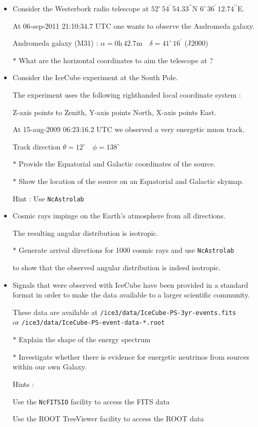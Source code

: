 {\red
\begin{itemize}
\item Consider the Westerbork radio telescope at
      $52^{\circ}\,54^{\prime}\,54.33^{\prime\prime}$N
      $6^{\circ}\,36^{\prime}\,12.74^{\prime\prime}$E.
\item[] At 06-sep-2011 21:10:34.7 UTC one wants to observe the Andromeda galaxy.
\item[] Andromeda galaxy (M31) : $\alpha=0\text{h}\,42.7\text{m} \quad \delta=41^{\circ}\,16^{\prime}$ (J2000)
\item[$\ast$] What are the horizontal coordinates to aim the telescope at ?
\item Consider the IceCube experiment at the South Pole.
\item[] The experiment uses the following righthanded local coordinate system :
\item[] Z-axis points to Zenith, Y-axis points North, X-axis points East.
\item[] At 15-aug-2009 06:23:16.2 UTC we observed a very energetic muon track.
\item[] Track direction $\theta=12^{\circ} \quad \phi=138^{\circ}$
\item[$\ast$] Provide the Equatorial and Galactic coordinates of the source.
\item[$\ast$] Show the location of the source on an Equatorial and Galactic skymap.
\item[] Hint : Use {\tt NcAstrolab}
\end{itemize}
}

\Tr
{\red
\begin{itemize}
\item Cosmic rays impinge on the Earth's atmosphere from all directions.
\item[] The resulting angular distribution is isotropic.
\item[$\ast$] Generate arrival directions for 1000 cosmic rays and use {\tt NcAstrolab}
\item[] to show that the observed angular distribution is indeed isotropic.
\item Signals that were observed with IceCube have been provided in a standard format
      in order to make the data available to a larger scientific community.
\item[] These data are available at {\tt /ice3/data/IceCube-PS-3yr-events.fits}\\
        or {\tt /ice3/data/IceCube-PS-event-data-*.root}
\item[$\ast$] Explain the shape of the energy spectrum
\item[$\ast$] Investigate whether there is evidence for energetic neutrinos from sources within our own Galaxy.
\item[] Hints :
\item[] Use the {\tt NcFITSIO} facility to access the FITS data
\item[] Use the ROOT TreeViewer facility to access the ROOT data
\end{itemize}
}